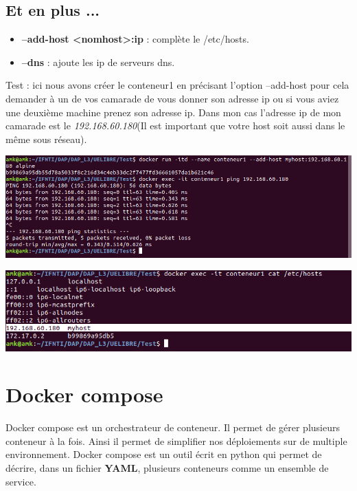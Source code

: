 \documentclass[12pt,a4paper]{article}
\begin{document}
\subsection{Et en plus ...}
\begin{itemize}
\item \textbf{--add-host <nomhost>:ip} : complète le /etc/hosts.
\item \textbf{--dns} : ajoute les ip de serveurs dns.
\end{itemize}

Test : ici nous avons créer le conteneur1 en précisant l'option --add-host pour cela 
demander à un de vos camarade de vous donner son adresse ip ou si vous aviez une deuxième
machine prenez son adresse ip. Dans mon cas l'adresse ip de mon camarade est le 
\textit{192.168.60.180}(Il est important que votre host soit aussi dans le même sous réseau). 
\begin{center}
\includegraphics[scale=0.5]{img/add_host.png}
\end{center}
\begin{center}
\includegraphics[scale=0.5]{img/add_host_2.png}
\end{center}

\section{Docker compose}
Docker compose est un orchestrateur de conteneur. Il permet de gérer plusieurs conteneur à 
la fois. Ainsi il permet de simplifier nos déploiements sur de multiple environnement.
Docker compose est un outil écrit en python qui permet de décrire, dans un fichier
\textbf{YAML}, plusieurs conteneurs comme un ensemble de service.
\end{document}
